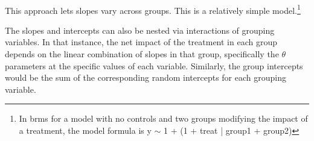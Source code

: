 \documentclass[12pt]{article}
\begin{document}
\begin{align*}
\end{align*}


This approach lets slopes vary across groups. 
This is a relatively simple model.\footnote{In brms for a model with no controls and two groups modifying the impact of a treatment, the model formula is y $\sim$ 1 + (1 + treat | group1 + group2)}  


The slopes and intercepts can also be nested via interactions of grouping variables. 
In that instance, the net impact of the treatment in each group depends on the linear combination of slopes in that group, specifically the $\theta$ parameters at the specific values of each variable. 
Similarly, the group intercepts would be the sum of the corresponding random intercepts for each grouping variable.


\end{document}

